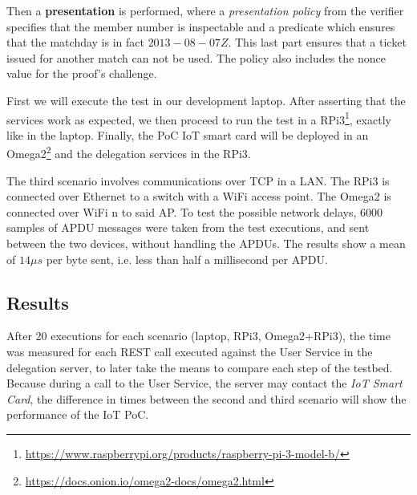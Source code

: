 Then a \textbf{presentation} is performed, where a \textit{presentation policy} from the verifier specifies that the member number is inspectable and a predicate which ensures that the matchday is in fact $2013-08-07Z$. This last part ensures that a ticket issued for another match can not be used. The policy also includes the nonce value for the proof's challenge.

\hfil


First we will execute the test in our development laptop. After asserting that the services work as expected, we then proceed to run the test in a RPi3\footnote{\url{https://www.raspberrypi.org/products/raspberry-pi-3-model-b/}}, exactly like in the laptop. Finally, the PoC IoT smart card will be deployed in an Omega2\footnote{\url{https://docs.onion.io/omega2-docs/omega2.html}} and the delegation services in the RPi3.

\hfil

The third scenario involves communications over TCP in a LAN. The RPi3 is connected over Ethernet to a switch with a WiFi access point. The Omega2 is connected over WiFi n to said AP. To test the possible network delays, $6000$ samples of APDU messages were taken from the test executions, and sent between the two devices, without handling the APDUs. The results show a mean of $14\mu s$ per byte sent, i.e. less than half a millisecond per APDU.



\subsection{Results}

After 20 executions for each scenario (laptop, RPi3, Omega2+RPi3), the time was measured for each REST call executed against the User Service in the delegation server, to later take the means to compare each step of the testbed. Because during a call to the User Service, the server may contact the \textit{IoT Smart Card}, the difference in times between the second and third scenario will show the performance of the IoT PoC.


